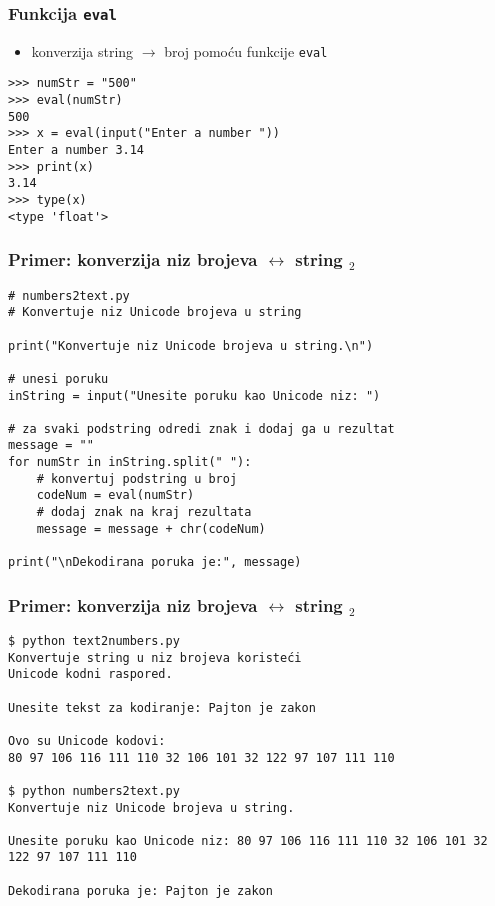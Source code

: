 \documentclass[utf8,compress,aspectratio=169]{beamer}
\begin{document}
\begin{frame}[fragile]
  \frametitle{Funkcija \texttt{eval}}
  \begin{itemize}
    \item konverzija string $\rightarrow$ broj pomoću funkcije \texttt{eval}
  \end{itemize}
\begin{verbatim}
>>> numStr = "500"
>>> eval(numStr)
500
>>> x = eval(input("Enter a number "))
Enter a number 3.14
>>> print(x)
3.14
>>> type(x)
<type 'float'>
\end{verbatim}
\end{frame}

\begin{frame}[fragile,shrink=10]
  \frametitle{Primer: konverzija niz brojeva $\leftrightarrow$ string $_2$}
\begin{verbatim}
# numbers2text.py
# Konvertuje niz Unicode brojeva u string

print("Konvertuje niz Unicode brojeva u string.\n")

# unesi poruku
inString = input("Unesite poruku kao Unicode niz: ")

# za svaki podstring odredi znak i dodaj ga u rezultat
message = ""
for numStr in inString.split(" "):
    # konvertuj podstring u broj
    codeNum = eval(numStr)
    # dodaj znak na kraj rezultata
    message = message + chr(codeNum)

print("\nDekodirana poruka je:", message)
\end{verbatim}
\end{frame}

\begin{frame}[fragile,shrink=10]
  \frametitle{Primer: konverzija niz brojeva $\leftrightarrow$ string $_2$}
\begin{verbatim}
$ python text2numbers.py
Konvertuje string u niz brojeva koristeći
Unicode kodni raspored.

Unesite tekst za kodiranje: Pajton je zakon

Ovo su Unicode kodovi:
80 97 106 116 111 110 32 106 101 32 122 97 107 111 110

$ python numbers2text.py
Konvertuje niz Unicode brojeva u string.

Unesite poruku kao Unicode niz: 80 97 106 116 111 110 32 106 101 32 122 97 107 111 110

Dekodirana poruka je: Pajton je zakon
\end{verbatim}
\end{frame}
\end{document}
